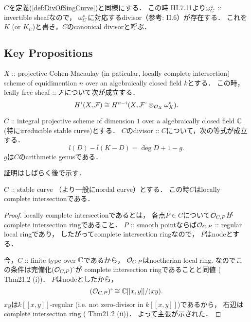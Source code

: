 \documentclass[a4paper]{jsarticle}
\begin{document}
    \begin{Def}
        $C$を定義(\ref{def:DivOfSingCurve})と同様にする．
        この時\cite{HarAG} III.7.11より$\omega^{\circ}_C$ :: invertible sheafなので，
        $\omega^{\circ}_C$に対応するdivisor（参考: \cite{HarAG} II.6）が存在する．
        これを$K$ (or $K_C$)と書き，$C$のcanonical divisorと呼ぶ．
    \end{Def}

    \subsection{Key Propositions}
    \begin{Thm} \label{thm:Hi_iso_Hn-i}
        $X$ :: projective Cohen-Macaulay (in paticular, locally complete intersection)
        scheme of equidimention $n$
        over an algebraically closed field $k$とする．
        この時，lcally free sheaf :: $\mathcal{F}$について次が成立する．
        \[ H^i(X, \mathcal{F}) \cong H^{n-i}(X, \mathcal{F} \,\check{}\, \otimes_{\mathcal{O}_X} \omega^{\circ}_X). \]
    \end{Thm}

    \begin{Thm} \label{thm:RRforSingCurve}
        $C$ :: integral projective scheme of dimension $1$
        over a algebraically closed field $\mathbb{C}$
        (特にirreducible stable curve)とする．
        $C$のdivisor :: $C$について，次の等式が成立する．
        \[ l(D)-l(K-D)=\deg D+1-g. \]
        $g$は$C$のarithmetic genusである．
    \end{Thm}
    証明はしばらく後で示す．

    \begin{Lemma}
        $C$ :: stable curve （より一般にnordal curve）とする．
        この時$C$はlocally complete intersectionである．
    \end{Lemma}
    \begin{proof}
        locally complete intersectionであるとは，
        各点$P \in C$について$\mathcal{O}_{C, P}$がcomplete intersection ringであること．
        $P$ :: smooth pointならば$\mathcal{O}_{C, P}$ :: regular local ringであり，
        したがってcomplete intersection ringなので，
        $P$はnodeとする．

        今，$C$ :: finite type over $\mathbb{C}$であるから，
        $\mathcal{O}_{C, P}$はnoetherian local ring.
        なのでこの条件は完備化$(\mathcal{O}_{C, P})\,\hat{}\,$が
        complete intersection ringであることと同値
        (\cite{Mat} Thm21.2 (i))．
        $P$はnodeとしたから，
        \[ (\mathcal{O}_{C, P})\,\hat{}\, \cong \mathbb{C}[[x,y]]/(xy). \]
        $xy$は$k[[x,y]]$-regular (i.e. not zero-divisor in $k[[x,y]]$)であるから，
        右辺はcomplete intersection ring (\cite{Mat} Thm21.2 (ii))．
        よって主張が示された．
    \end{proof}
\end{document}
